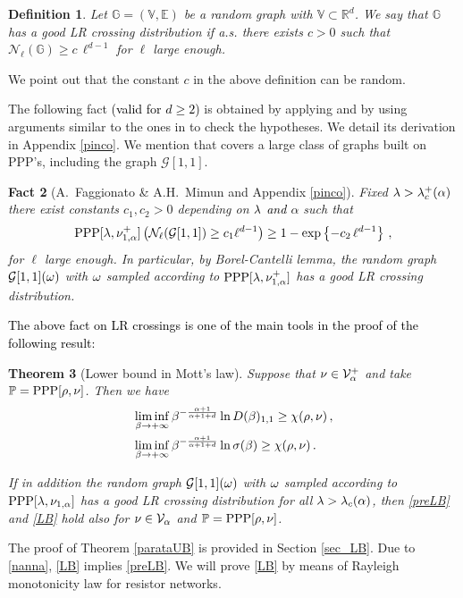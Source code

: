 \documentclass[12pt,a4paper,reqno]{amsart}
\newtheorem{Theorem}{Theorem}[section]
\newtheorem{Fact}[Theorem]{Fact}
\newtheorem{Definition}[Theorem]{Definition}
\newcommand{\cG}{\ensuremath{\mathcal G}}
\newcommand{\cN}{\ensuremath{\mathcal N}}
\newcommand{\cV}{\ensuremath{\mathcal V}}
\newcommand{\bbE}{{\ensuremath{\mathbb E}} }
\newcommand{\bbG}{{\ensuremath{\mathbb G}} }
\newcommand{\bbP}{{\ensuremath{\mathbb P}} }
\newcommand{\bbR}{{\ensuremath{\mathbb R}} }
\newcommand{\bbV}{{\ensuremath{\mathbb V}} }
\let\a=\alpha \let\b=\beta   \let\d=\delta  \let\e=\varepsilon
\newcommand{\rosso}{\textcolor{black}} %
\newcommand{\be}{\begin{equation}}
\newcommand{\en}{\end{equation}}
\newcommand{\cv}{\rosso{\cV_\alpha}}
\newcommand{\cvp}{\rosso{\cV^+_\alpha}}
\begin{document}
\begin{Definition}\label{good_LR_distr}
Let $\bbG=(\bbV,\bbE)$ be a random  graph  with $\bbV\subset \bbR^d$.
We say that $\bbG$ has a   \emph{good LR crossing  distribution} if   a.s. there exists 
 $c>0$ such that  $\cN_\ell(\bbG)\geq c\, \ell^{d-1}$ for $\ell $ large enough.
 \end{Definition}
We point out that the constant $c$ in the above definition can be random.

The following fact \rosso{(valid for $d\geq 2$)} is obtained by applying   \cite[Thm.~1]{FagMim2} and by using arguments similar to the ones in  \cite[Section~8]{FagMim2} to check the hypotheses. We detail its derivation in Appendix \ref{pinco}. We mention that \cite{FagMim2} covers a large class of graphs built on PPP's, including the   graph $\cG[1,1]$. 
\begin{Fact}[A.~Faggionato \& A.H.~Mimun \cite{FagMim2} and Appendix \ref{pinco}] \label{cortocircuito}
 Fixed
 $\l > \l^+_c(\a)$ there exist  constants $c_1,c_2>0$ depending on $\lambda$ \rosso{and} $\a$ such that 
 \be
{\rm PPP}[\l , \nu^+_{1,\a}] \left( \cN_\ell (\cG[1,1]) \geq  c_1 \ell^{d-1}\right)\geq 1- \exp\left \{- c_2 \,\ell ^{d-1}\right\}\,,
\en
for $\ell$ large enough.
In particular, by Borel-Cantelli lemma, the random graph $\cG[1,1](\o)$ with $\omega$ sampled according to 
${\rm PPP}[\l , \nu^+_{1,\a}] $ has a good LR crossing distribution.
\end{Fact}

\rosso{The above fact on LR crossings is one of the main tools in the proof of the following result:}
  \begin{Theorem}[Lower bound in Mott's law] \label{parataLB} Suppose that  $\nu\in \cvp$ and take $\bbP={\rm PPP}[\rho,\nu]$.
Then we have 
 \begin{align}
 &  \liminf _{\b\to +\infty} \b^{- \rosso{\frac{\a+1}{\a+1+d}} } \ln D(\b)_{1,1}  \geq  \chi(\rho, \nu)\,, \label{preLB}\\
&  \liminf _{\b\to +\infty} \b^{- \rosso{\frac{\a+1}{\a+1+d}} } \ln \s(\b)\geq    \chi (\rho, \nu)
\,.\label{LB}
  \end{align}
  
  If in addition  the random graph $\cG[1,1](\o)$ with $\omega$ sampled according to ${\rm PPP}[ \lambda, \nu_{1,\alpha}] $ has a good LR crossing distribution  for all $\l>\l_c(\a)$, then 
  \eqref{preLB} and \eqref{LB} hold also for  $\nu\in \cv$ and $\bbP={\rm PPP}[\rho,\nu]$.  \end{Theorem}
The proof of Theorem \ref{parataUB} is provided in Section \ref{sec_LB}. Due to \eqref{nanna},  \eqref{LB} implies \eqref{preLB}. We will  prove \eqref{LB} by means of  Rayleigh monotonicity law for resistor networks.
\end{document}
